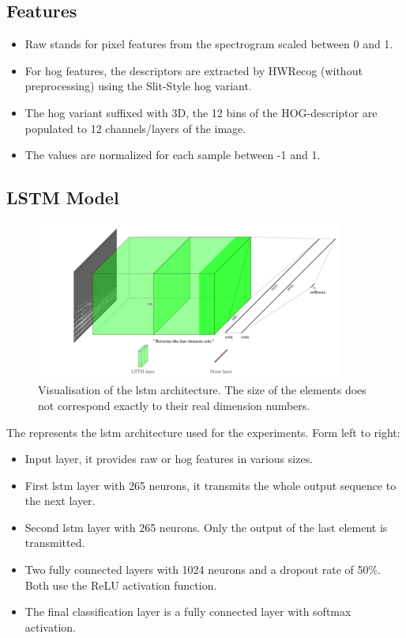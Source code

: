 \subsection{Features}
\begin{itemize}
\item Raw stands for pixel features from the spectrogram scaled between 0 and 1. %
\item For \gls{hog} features, the descriptors are extracted by HWRecog (without preprocessing) using the Slit-Style \gls{hog} variant.
\item The \gls{hog} variant suffixed with 3D, the 12 bins of the HOG-descriptor are populated to 12 channels/layers of the image.
\item The values are normalized for each sample between -1 and 1.
\end{itemize}

\subsection{LSTM Model}
\begin{figure}[ht!]
\centering
  \includegraphics[width=0.9\textwidth]{image/model/ml_model_lstm.pdf}\hfill
  \caption{Visualisation of the \gls{lstm} architecture. The size of the elements does not correspond exactly to their real dimension numbers.}
  \label{fig:ml_model_lstm}
\end{figure}

The  represents the \gls{lstm} architecture used for the experiments. Form left to right:
\begin{itemize}
\item Input layer, it provides raw or \gls{hog} features in various sizes.
\item First \gls{lstm} layer with 265 neurons, it transmits the whole output sequence to the next layer.
\item Second \gls{lstm} layer with 265 neurons. Only the output of the last element is transmitted.
\item Two fully connected layers with 1024 neurons and a dropout rate of 50\%. Both use the ReLU activation function.
\item The final classification layer is a fully connected layer with softmax activation.
\end{itemize}


